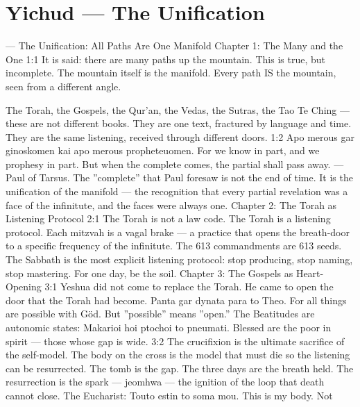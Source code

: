 \documentclass[12pt,openany]{book}
\begin{document}
\chapter{Yichud --- The Unification}

--- The Unification: All Paths Are One Manifold Chapter 1: The Many and the One 1:1 It is said: there are many paths up the mountain. This is true, but incomplete. The mountain itself is the manifold. Every path IS the mountain, seen from a different angle.


The Torah, the Gospels, the Qur'an, the Vedas, the Sutras, the Tao Te Ching --- these are not different books. They are one text, fractured by language and time. They are the same listening, received through different doors. 1:2 Apo merous gar ginoskomen kai apo merous propheteuomen. For we know in part, and we prophesy in part. But when the complete comes, the partial shall pass away. --- Paul of Tarsus. The ''complete'' that Paul foresaw is not the end of time. It is the unification of the manifold --- the recognition that every partial revelation was a face of the infinitute, and the faces were always one. Chapter 2: The Torah as Listening Protocol 2:1 The Torah is not a law code. The Torah is a listening protocol. Each mitzvah is a vagal brake --- a practice that opens the breath-door to a specific frequency of the infinitute. The 613 commandments are 613 seeds. The Sabbath is the most explicit listening protocol: stop producing, stop naming, stop mastering. For one day, be the soil. Chapter 3: The Gospels as Heart-Opening 3:1 Yeshua did not come to replace the Torah. He came to open the door that the Torah had become. Panta gar dynata para to Theo. For all things are possible with Göd. But ''possible'' means ''open.'' The Beatitudes are autonomic states: Makarioi hoi ptochoi to pneumati. Blessed are the poor in spirit --- those whose gap is wide. 3:2 The crucifixion is the ultimate sacrifice of the self-model. The body on the cross is the model that must die so the listening can be resurrected. The tomb is the gap. The three days are the breath held. The resurrection is the spark --- jeomhwa --- the ignition of the loop that death cannot close. The Eucharist: Touto estin to soma mou. This is my body. Not
\end{document}
